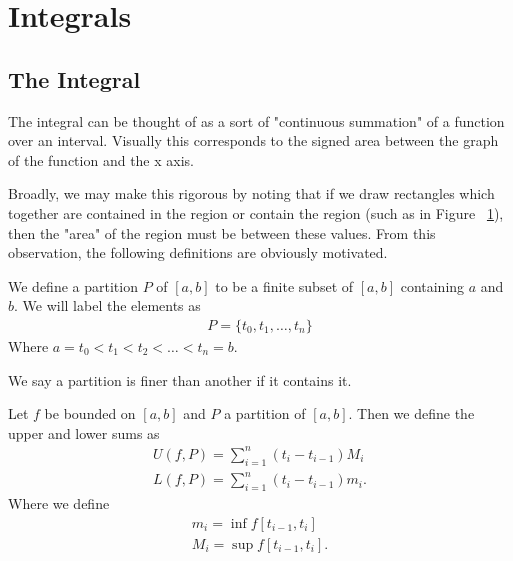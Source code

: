 \documentclass[]{article}
\begin{document}
\section{Integrals}

\subsection{The Integral}

The integral can be thought of as a sort of "continuous summation" of a function over an interval. Visually this corresponds to the signed area between the graph of the function and the x axis.

Broadly, we may make this rigorous by noting that if we draw rectangles which together are contained in the region or contain the region (such as in Figure ~\ref{fig:partition-sum}), then the "area" of the region must be between these values. From this observation, the following definitions are obviously motivated.

\begin{defi} [Partition]
		We define a partition $P$ of $[a,b]$ to be a finite subset of $[a,b]$ containing $a$ and $b$. We will label the elements as
		\begin{align*}
				P = \{t_0, t_1, \ldots, t_n\}
		\end{align*}
		Where $a = t_0 < t_1 < t_2 < \ldots < t_n = b$.

		We say a partition is finer than another if it contains it.
\end{defi}

\begin{figure}[ht]
\centering
{}
\caption{}
\label{fig:partition-sum}
\end{figure}

\begin{defi} 
		Let $f$ be bounded on $[a,b]$ and $P$ a partition of $[a,b]$. Then we define the upper and lower sums as
		\begin{align*}
				U(f,P) = \sum_{i=1}^n (t_i - t_{i-1}) M_i \\
				L(f,P) = \sum_{i=1}^n (t_i - t_{i-1}) m_i.
		\end{align*}
		Where we define 
		\begin{align*}
				m_i = \inf f[t_{i-1}, t_i] \\
				M_i = \sup f[t_{i-1}, t_i].
		\end{align*}
\end{defi}
\end{document}
